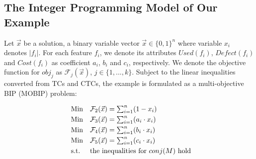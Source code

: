 \subsection{The Integer Programming Model of Our Example}\label{sec:spl_ip_problem}
Let $\vec x$ be a solution, a binary variable vector $\vec x \in \{0,1\}^n$  where variable $x_i$ denotes $|f_i|$.
For each feature $f_i$, we denote its attributes $Used(f_i)$, $Defect(f_i)$ and $Cost(f_i)$ as coefficient $a_i$, $b_i$ and $c_i$, respectively. We denote the objective function for $obj_j$ as $\mathcal{F}_j(\vec x)$, $j \in \{1,...,k\}$. Subject to the linear inequalities converted from TCs and CTCs,
the example is formulated  as a multi-objective BIP (MOBIP) problem:

\begin{equation}\label{formula:mop}
\begin{array}{ll@{}r@{}r@{}l}
    \text{Min} & \mathcal{F}_2(\vec x)= \sum\nolimits_{i=1}^{n}(1-x_i) \\[\jot]
    \text{Min} & \mathcal{F}_3(\vec x)=\sum\nolimits_{i=1}^{n}(a_i\cdot x_i) \\[\jot]
    \text{Min} & \mathcal{F}_4(\vec x)=\sum\nolimits_{i=1}^{n}(b_i\cdot x_i) \\[\jot]
    \text{Min} & \mathcal{F}_5(\vec x)=\sum\nolimits_{i=1}^{n}(c_i\cdot x_i) \\[\jot]
    \text{s.t.} & \text{the inequalities for $conj(M)$ hold}\\[\jot]

  \end{array}
\end{equation}
